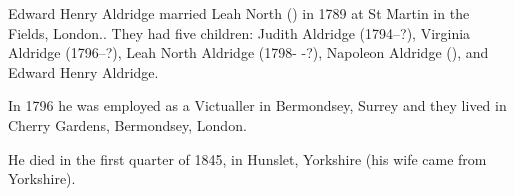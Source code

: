 
Edward Henry Aldridge married Leah North () in 1789 at St Martin in the Fields, London.\cite{EHAldridgeMarriage}. They had five children: Judith Aldridge (1794--?), Virginia Aldridge (1796--?), Leah North Aldridge (1798- -?), Napoleon Aldridge (), and Edward Henry Aldridge.

In 1796 he was employed as a Victualler in Bermondsey, Surrey and they lived in Cherry Gardens, Bermondsey, London. \cite{EHAldridgeWork}

He died in the first quarter of 1845, in Hunslet, Yorkshire (his wife came from Yorkshire).\cite{EHAldridgeDeath}
